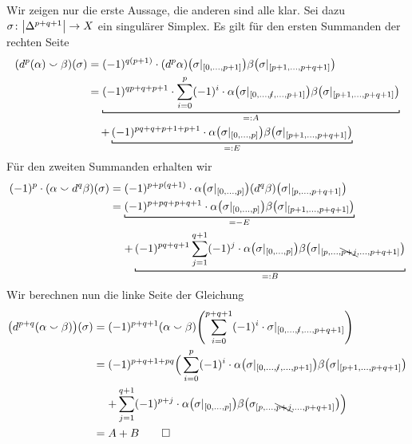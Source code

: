 \begin{beweis}
	Wir zeigen nur die erste Aussage, die anderen sind alle klar.
	Sei dazu $\sigma \colon \abs*{\Delta^{p+q+1}}\to X$ ein singulärer Simplex.
	Es gilt für den ersten Summanden der rechten Seite
	\begin{align}
		\enbrace*{d^p(\alpha) \cupp \beta}(\sigma) &= (-1)^{q(p+1)}\cdot  (d^p \alpha) \enbrace*{\sigma|_{\benbrace*{0,\ldots ,p+1}}} \beta \enbrace*{\sigma|_{\benbrace*{p+1,\ldots ,p+q+1}}} \\
		&= \Underbracket{(-1)^{qp+q+p+1} \cdot \sum_{i=0}^{p} (-1)^i \cdot \alpha \enbrace*{\sigma|_{\benbrace*{0, \ldots ,\slashedi,\ldots ,p+1}}} \beta \enbrace*{\sigma|_{\benbrace*{p+1,\ldots ,p+q+1}}}}{=: A} \\
		&\mathbin{\hphantom{=}} + \,\Underbracket{(-1)^{pq+q+p+1+p+1} \cdot \alpha \enbrace*{\sigma|_{\benbrace*{0,\ldots ,p}}} \beta \enbrace*{\sigma|_{\benbrace*{p+1,\ldots ,p+q+1}}}}{=: E}
	\end{align}
	Für den zweiten Summanden erhalten wir
	\begin{align}
		(-1)^p \cdot \enbrace*{\alpha \cupp d^q \beta}(\sigma) &= (-1)^{p+p(q+1)} \cdot \alpha \enbrace*{\sigma|_{\benbrace*{0,\ldots ,p}}} (d^q \beta) \enbrace*{\sigma|_{\benbrace*{p,\ldots ,p+q+1}}} \\
		&= \Underbracket{(-1)^{p+pq+p+q+1} \cdot \alpha \enbrace*{\sigma|_{\benbrace*{0,\ldots ,p}}} \beta \enbrace*{\sigma|_{\benbrace*{p+1,\ldots ,p+q+1}}}}{= -E}\\
		&\mathrel{\hphantom{=}} + \,\Underbracket{(-1)^{pq+q+1} \sum_{j=1}^{q+1} (-1)^j \cdot \alpha \enbrace*{\sigma|_{\benbrace*{0,\ldots ,p}}} \beta \enbrace*{\sigma|_{\benbrace{p,\ldots , \bcancel{p+j}, \ldots , p+q+1}}}}{=: B}
	\end{align}
	Wir berechnen nun die linke Seite der Gleichung
	\begin{align}
		\enbrace*{d^{p+q}(\alpha \cupp \beta)} (\sigma) &= (-1)^{p+q+1} (\alpha \cupp \beta) \enbrace*{\sum_{i=0}^{p+q+1} (-1)^i \cdot \sigma|_{\benbrace*{0, \ldots ,\slashedi, \ldots , p+q+1}} } \\
		&= (-1)^{p+q+1+pq} \Big( \sum_{i=0}^{p} (-1)^i \cdot \alpha \enbrace*{\sigma|_{\benbrace{0, \ldots , \slashedi, \ldots ,p+1}}} \beta \enbrace*{\sigma|_{\benbrace{p+1,\ldots , p+q+1}}} \\
		&\mathrel{\hphantom{=}} + \sum_{j=1}^{q+1} (-1)^{p+j} \cdot \alpha \enbrace*{\sigma|_{\benbrace{0,\ldots ,p}}} \beta \enbrace*{\sigma_{\benbrace*{p,\ldots , \bcancel{p+j}, \ldots ,p+q+1}}} \Big)\\
		&= A+ B \qedhere
	\end{align}
\end{beweis}

